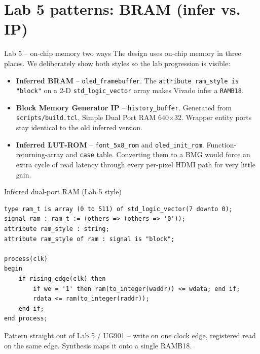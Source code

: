 \documentclass[aspectratio=169,10pt]{beamer}
\begin{document}
\section{Lab 5 patterns: BRAM (infer vs. IP)}

\begin{frame}{Lab 5 -- on-chip memory two ways}
    The design uses on-chip memory in three places. We deliberately
    show both styles so the lab progression is visible:

    \begin{itemize}
        \item \textbf{Inferred BRAM} -- \texttt{oled\_framebuffer}.
              The \texttt{attribute ram\_style is "block"} on a 2-D
              \texttt{std\_logic\_vector} array makes Vivado infer a
              \texttt{RAMB18}.
        \item \textbf{Block Memory Generator IP} -- \texttt{history\_buffer}.
              Generated from \texttt{scripts/build.tcl}, Simple Dual
              Port RAM 640$\times$32. Wrapper entity ports stay
              identical to the old inferred version.
        \item \textbf{Inferred LUT-ROM} -- \texttt{font\_5x8\_rom} and
              \texttt{oled\_init\_rom}. Function-returning-array and
              \texttt{case} table. Converting them to a BMG would force
              an extra cycle of read latency through every per-pixel
              HDMI path for very little gain.
    \end{itemize}
\end{frame}

\begin{frame}[fragile]{Inferred dual-port RAM (Lab 5 style)}
\begin{lstlisting}[style=vhdl]
type ram_t is array (0 to 511) of std_logic_vector(7 downto 0);
signal ram : ram_t := (others => (others => '0'));
attribute ram_style : string;
attribute ram_style of ram : signal is "block";

process(clk)
begin
    if rising_edge(clk) then
        if we = '1' then ram(to_integer(waddr)) <= wdata; end if;
        rdata <= ram(to_integer(raddr));
    end if;
end process;
\end{lstlisting}
    \scriptsize Pattern straight out of Lab 5 / UG901 -- write on one
    clock edge, registered read on the same edge. Synthesis maps it
    onto a single RAMB18.
\end{frame}
\end{document}
